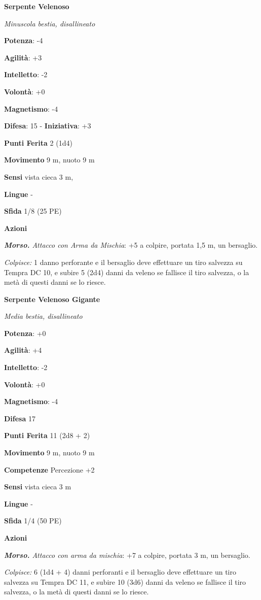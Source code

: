 \begin{multicols}{2}
\textbf{Serpente Velenoso}

\emph{Minuscola bestia, disallineato}

\textbf{Potenza}: -4

\textbf{Agilità}: +3

\textbf{Intelletto}: -2

\textbf{Volontà}: +0

\textbf{Magnetismo}: -4

\textbf{Difesa}: 15 - \textbf{Iniziativa}: +3

\textbf{Punti Ferita} 2 (1d4)

\textbf{Movimento} 9 m, nuoto 9 m

\textbf{Sensi} vista cieca 3 m, 

\textbf{Lingue} -

\textbf{Sfida} 1/8 (25 PE)

\textbf{Azioni}

\emph{\textbf{Morso.} Attacco con Arma da Mischia}: +5 a colpire,
portata 1,5 m, un bersaglio.

\emph{Colpisce:} 1 danno perforante e il bersaglio deve effettuare un
tiro salvezza su Tempra DC 10, e subire 5 (2d4) danni da veleno se
fallisce il tiro salvezza, o la metà di questi danni se lo riesce.

\textbf{Serpente Velenoso Gigante}

\emph{Media bestia, disallineato}

\textbf{Potenza}: +0

\textbf{Agilità}: +4

\textbf{Intelletto}: -2

\textbf{Volontà}: +0

\textbf{Magnetismo}: -4

\textbf{Difesa} 17

\textbf{Punti Ferita} 11 (2d8 + 2)

\textbf{Movimento} 9 m, nuoto 9 m

\textbf{Competenze} Percezione +2

\textbf{Sensi} vista cieca 3 m

\textbf{Lingue} -

\textbf{Sfida} 1/4 (50 PE)

\textbf{Azioni}

\emph{\textbf{Morso.} Attacco con arma da mischia}: +7 a colpire,
portata 3 m, un bersaglio.

\emph{Colpisce:} 6 (1d4 + 4) danni perforanti e il bersaglio deve
effettuare un tiro salvezza su Tempra DC 11, e subire 10 (3d6)
danni da veleno se fallisce il tiro salvezza, o la metà di questi danni
se lo riesce.


\end{multicols}
